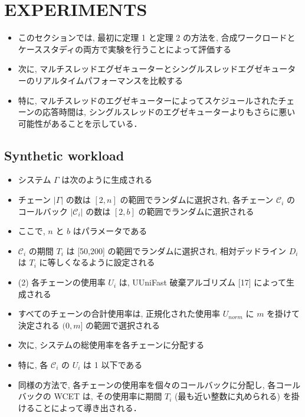 
\section{EXPERIMENTS}
\label{sec: experiments}


\begin{frame}{}
    \begin{itemize}
        \item このセクションでは, 最初に定理 1 と定理 2 の方法を, 合成ワークロードとケーススタディの両方で実験を行うことによって評価する
\item 次に, マルチスレッドエグゼキューターとシングルスレッドエグゼキューターのリアルタイムパフォーマンスを比較する
\item 特に, マルチスレッドのエグゼキューターによってスケジュールされたチェーンの応答時間は, シングルスレッドのエグゼキューターよりもさらに悪い可能性があることを示している．
    \end{itemize}
\end{frame}


\subsection{Synthetic workload}
\label{ssec: synthetic workload}

\begin{frame}{}
    \begin{itemize}
        \item システム $\Gamma$ は次のように生成される
\item チェーン $|\Gamma|$ の数は $[2, n]$ の範囲でランダムに選択され, 各チェーン $\mathcal{C}_{i}$ のコールバック $\left|\mathcal{C}_{i}\right|$ の数は $[2, b]$ の範囲でランダムに選択される
\item ここで, $n$ と $b$ はパラメータである
\item $\mathcal{C}_{i}$ の期間 $T_{i}$ は [50,200] の範囲でランダムに選択され, 相対デッドライン $D_{i}$ は $T_{i}$ に等しくなるように設定される
\item (2) 各チェーンの使用率 $U_{i}$ は, UUniFast 破棄アルゴリズム [17] によって生成される
\item すべてのチェーンの合計使用率は, 正規化された使用率 $U_{n o r m}$ に $m$ を掛けて決定される $(0, m]$ の範囲で選択される
\item 次に, システムの総使用率を各チェーンに分配する
\item 特に, 各 $\mathcal{C}_{i}$ の $U_{i}$ は 1 以下である
\item 同様の方法で, 各チェーンの使用率を個々のコールバックに分配し, 各コールバックの WCET は, その使用率に期間 $T_{i}$ (最も近い整数に丸められる) を掛けることによって導き出される．
    \end{itemize}
\end{frame}


